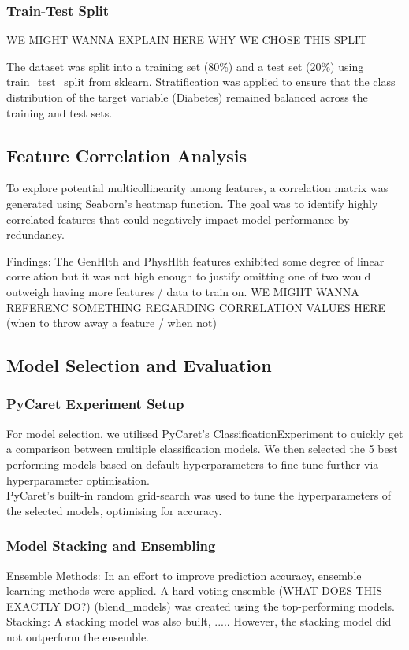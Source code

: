 \documentclass[a4paper,12pt]{article}
\begin{document}
\subsubsection{Train-Test Split}
WE MIGHT WANNA EXPLAIN HERE WHY WE CHOSE THIS SPLIT

The dataset was split into a training set (80\%) and a test set (20\%) using train\_test\_split from 
sklearn. Stratification was applied to ensure that the class distribution of the target variable 
(Diabetes) remained balanced across the training and test sets.

\subsection{Feature Correlation Analysis}
To explore potential multicollinearity among features, a correlation matrix was generated using 
Seaborn's heatmap function. The goal was to identify highly correlated features that could negatively 
impact model performance by redundancy.

Findings: The GenHlth and PhysHlth features exhibited some degree of linear correlation but it was
not high enough to justify omitting one of two would outweigh having more features / data to train 
on.
WE MIGHT WANNA REFERENC SOMETHING REGARDING CORRELATION VALUES HERE 
(when to throw away a feature / when not)

\subsection{Model Selection and Evaluation}
\subsubsection{PyCaret Experiment Setup}
For model selection, we utilised PyCaret's ClassificationExperiment to quickly get a 
comparison between multiple classification models. We then selected the 
5 best performing models based on default hyperparameters to fine-tune further via hyperparameter
optimisation.
\\
PyCaret’s built-in random grid-search was used to tune the hyperparameters of the selected models, 
optimising for accuracy.

\subsubsection{Model Stacking and Ensembling}
Ensemble Methods: In an effort to improve prediction accuracy, ensemble learning methods were applied. 
A hard voting ensemble (WHAT DOES THIS EXACTLY DO?) (blend\_models) was created using the 
top-performing models.
Stacking: A stacking model was also built, ..... 
However, the stacking model did not outperform the ensemble.
\end{document}
